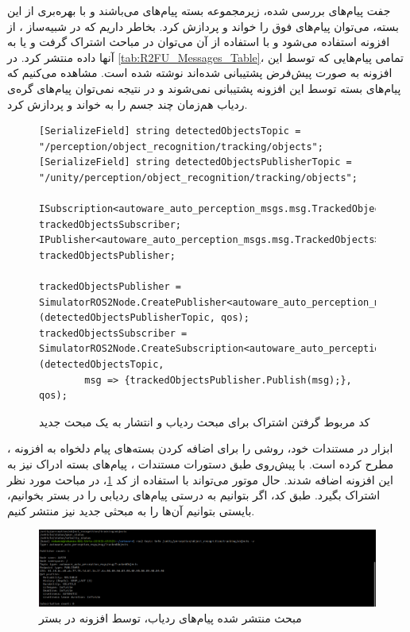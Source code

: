جفت پیام‌های بررسی شده، زیرمجموعه بسته پیام‌های  می‌باشند و با بهره‌بری از این بسته، می‌توان پیام‌های فوق را خواند و پردازش کرد. بخاطر داریم که در شبیه‌ساز ، از افزونه  استفاده می‌شود و با استفاده از آن می‌توان در مباحث  اشتراک گرفت و یا به آنها داده منتشر کرد. در \cref{tab:R2FU_Messages_Table}، تمامی پیام‌هایی که توسط این افزونه به صورت پیش‌فرض پشتیبانی شده‌اند نوشته شده است. مشاهده می‌کنیم که پیام‌های بسته  توسط این افزونه پشتیبانی نمی‌شوند و در نتیجه نمی‌توان پیام‌های گره‌ی ردیاب هم‌زمان چند جسم را به خواند و پردازش کرد. \begin{figure}[h!]
    \centering
    \begin{latin}
        \begin{lstlisting}[style=codecs]
[SerializeField] string detectedObjectsTopic = "/perception/object_recognition/tracking/objects";
[SerializeField] string detectedObjectsPublisherTopic = "/unity/perception/object_recognition/tracking/objects";

ISubscription<autoware_auto_perception_msgs.msg.TrackedObjects> trackedObjectsSubscriber;
IPublisher<autoware_auto_perception_msgs.msg.TrackedObjects> trackedObjectsPublisher;

trackedObjectsPublisher = SimulatorROS2Node.CreatePublisher<autoware_auto_perception_msgs.msg.TrackedObjects>(detectedObjectsPublisherTopic, qos);
trackedObjectsSubscriber = SimulatorROS2Node.CreateSubscription<autoware_auto_perception_msgs.msg.TrackedObjects>(detectedObjectsTopic, 
        msg => {trackedObjectsPublisher.Publish(msg);}, qos);
        \end{lstlisting}
    \end{latin}
    \caption{کد مربوط گرفتن اشتراک برای مبحث ردیاب و انتشار به یک مبحث جدید}
    \label{fig:Unity_Subscription_Code}
\end{figure}
ابزار  در مستندات خود، روشی را برای اضافه کردن بسته‌های پیام دلخواه به افزونه ، مطرح کرده‌ است. با پیش‌روی طبق دستورات مستندات ، پیام‌های بسته ادراک نیز به این افزونه اضافه شدند. حال موتور  می‌تواند با استفاده از کد \cref{fig:Unity_Subscription_Code}، در مباحث مورد نظر اشتراک بگیرد.
طبق کد، اگر بتوانیم به درستی پیام‌های ردیابی را در بستر  بخوانیم، بایستی بتوانیم آن‌ها را به مبحثی جدید نیز منتشر کنیم.
\begin{figure}[h!]
    \centering
    \includegraphics[width=1\linewidth]{figures/Unity_Publish_Tracked_Messages.png}
    \caption{مبحث منتشر شده پیام‌های ردیاب، توسط افزونه  در بستر }
    \label{fig:Unity_Publish_Tracked_Messages}
\end{figure}

